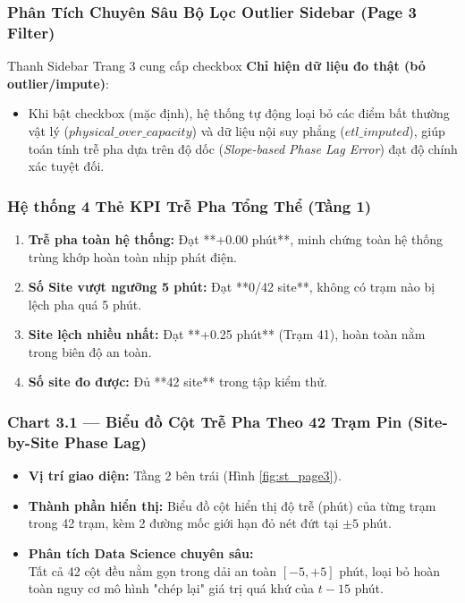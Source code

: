 \documentclass[12pt,a4paper]{article}
\begin{document}
\begin{center}
\end{center}

\subsubsection{Phân Tích Chuyên Sâu Bộ Lọc Outlier Sidebar (Page 3 Filter)}
Thanh Sidebar Trang 3 cung cấp checkbox \textbf{Chỉ hiện dữ liệu đo thật (bỏ outlier/impute)}:
\begin{itemize}
    \item Khi bật checkbox (mặc định), hệ thống tự động loại bỏ các điểm bất thường vật lý ($physical\_over\_capacity$) và dữ liệu nội suy phẳng ($etl\_imputed$), giúp toán tính trễ pha dựa trên độ dốc (\textit{Slope-based Phase Lag Error}) đạt độ chính xác tuyệt đối.
\end{itemize}

\subsubsection{Hệ thống 4 Thẻ KPI Trễ Pha Tổng Thể (Tầng 1)}
\begin{enumerate}
    \item \textbf{Trễ pha toàn hệ thống:} Đạt **+0.00 phút**, minh chứng toàn hệ thống trùng khớp hoàn toàn nhịp phát điện.
    \item \textbf{Số Site vượt ngưỡng 5 phút:} Đạt **0/42 site**, không có trạm nào bị lệch pha quá 5 phút.
    \item \textbf{Site lệch nhiều nhất:} Đạt **+0.25 phút** (Trạm 41), hoàn toàn nằm trong biên độ an toàn.
    \item \textbf{Số site đo được:} Đủ **42 site** trong tập kiểm thử.
\end{enumerate}

\subsubsection{Chart 3.1 — Biểu đồ Cột Trễ Pha Theo 42 Trạm Pin (Site-by-Site Phase Lag)}
\begin{itemize}
    \item \textbf{Vị trí giao diện:} Tầng 2 bên trái (Hình \ref{fig:st_page3}).
    \item \textbf{Thành phần hiển thị:} Biểu đồ cột hiển thị độ trễ (phút) của từng trạm trong 42 trạm, kèm 2 đường mốc giới hạn đỏ nét đứt tại $\pm 5$ phút.
    \item \textbf{Phân tích Data Science chuyên sâu:}\\ 
    Tất cả 42 cột đều nằm gọn trong dải an toàn $[-5, +5]$ phút, loại bỏ hoàn toàn nguy cơ mô hình "chép lại" giá trị quá khứ của $t-15$ phút.
\end{itemize}
\end{document}
